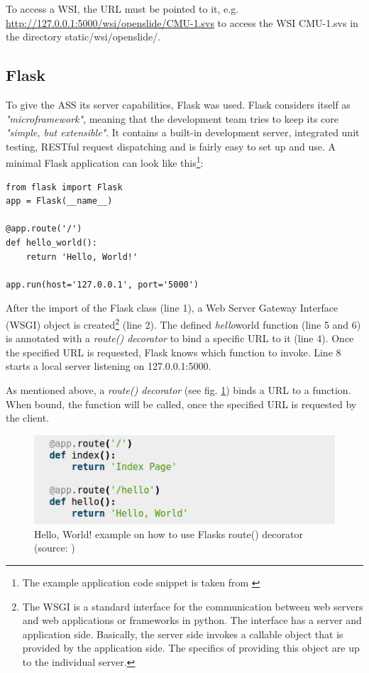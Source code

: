 To access a WSI, the URL must be pointed to it, e.g. \url{http://127.0.0.1:5000/wsi/openslide/CMU-1.svs} to access the WSI CMU-1.svs in the directory static/wsi/openslide/.


\subsection{Flask}
\label{sec4_flask}
To give the ASS its server capabilities, Flask was used. Flask considers itself as \emph{"microframework"}, meaning that the development team tries to keep its core \emph{"simple, but extensible"}\cite{web:flask}. It contains a built-in development server, integrated unit testing, RESTful request dispatching and is fairly easy to set up and use. A minimal Flask application can look like this\footnote{The example application code snippet is taken from \cite{web:flask}}:

\begin{lstlisting}[frame=single]
from flask import Flask
app = Flask(__name__)

@app.route('/')
def hello_world():
	return 'Hello, World!'

app.run(host='127.0.0.1', port='5000')
\end{lstlisting}

After the import of the Flask class (line 1), a Web Server Gateway Interface (WSGI) object is created\footnote{The WSGI is a standard interface for the communication between web servers and web applications or frameworks in python. The interface has a server and application side. Basically, the server side invokes a callable object that is provided by the application side. The specifics of providing this object are up to the individual server\cite{Brandl16}.} (line 2). The defined \emph{hello\textunderscore}world function (line 5 and 6) is annotated with a \emph{route() decorator} to bind a specific URL to it (line 4). Once the specified URL is requested, Flask knows which function to invoke. Line 8 starts a local server listening on 127.0.0.1:5000.

As mentioned above, a \emph{route() decorator} (see fig. \ref{fig4_routeDecorator}) binds a URL to a function. When bound, the function will be called, once the specified URL is requested by the client\cite{web:flask}.



\begin{figure}[H]
	\begin{center}
		\includegraphics[scale=0.5]{img/route.png}
		\caption{Hello, World! example on how to use Flasks route() decorator (source: \cite{web:flask})}
		\label{fig4_routeDecorator}
	\end{center}
\end{figure}


